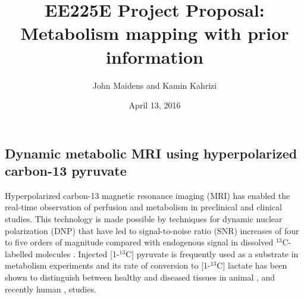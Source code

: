 \documentclass{article}
\begin{document}
\title{EE225E Project Proposal: \\
Metabolism mapping with prior information 
}
\author{John Maidens and Kamin Kahrizi}
\date{April 13, 2016} 

\maketitle


\subsection{Dynamic metabolic MRI using hyperpolarized carbon-13 pyruvate}


Hyperpolarized carbon-13 magnetic resonance imaging (MRI) has enabled the real-time observation of perfusion and metabolism in preclinical and clinical studies. %
This technology is made possible by techniques for dynamic nuclear polarization (DNP) that have led to signal-to-noise ratio (SNR) increases of four to five orders of magnitude compared with endogenous signal in dissolved $^{13}$C-labelled molecules  \cite{Ardenkjaer-Larsen03, Golman03}.  Injected [1-$^{13}$C] pyruvate is frequently used as a substrate in metabolism experiments and its rate of conversion to  [1-$^{13}$C] lactate has been shown to distinguish between healthy and diseased tissues in animal \cite{Day07}, and recently human \cite{Nelson13}, studies. 

\end{document}
